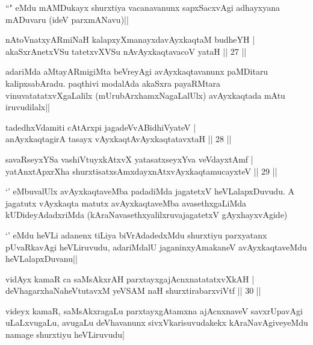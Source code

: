 \begin{artha}
``\stext " eMdu mAMDukayx shurxtiya vacanavanunx sapxSacxvAgi adhayxyana mADuvaru (ideV parxmANavu)||
\end{artha}

\begin{shl}
nAtoV\s natxyARmiNaH kalapxyXmanayxdavAyxkaqtaM budheYH |\\
akaSxrAnetxVSu tatetxvXVSu nAvAyxkaqtavacoV yataH \hfill || 27 ||
\end{shl}

\begin{artha}
adariMda aMtayARmigiMta beVreyAgi avAyxkaqtavanunx paMDitaru kalipxsabAradu. paqthivi modalAda akaSxra payaRMtara vinuvatatatxvXgaLalilx (mUrubArxhamxNagaLalUlx) avAyxkaqtada mAtu iruvudilalx||
\end{artha}

\begin{shl}
tadedhxVdamiti cAtArxpi jagadeVvABidhiVyateV |\\
anAyxkaqtagirA tasayx vAyxkaqtAvAyxkaqtatavxtaH \hfill || 28 ||
\end{shl}

\begin{shl}
savaRseyxYSa vashiVtuyxkAtxvX yatasatxseyxYva veVdayxtAmf |\\
yatAnxtApxrXha shurxtisatxsAmxdayxnAtx\s vAyxkaqtamucayxteV \hfill || 29 ||
\end{shl}

\begin{artha}
`\stext ' eMbuvalUlx avAyxkaqtaveMba padadiMda jagatetxV heVLalapxDuvudu. A jagatutx vAyxkaqta matutx avAyxkaqtaveMba avasethxgaLiMda kUDideyAdadxriMda (kAraNavasethxyalilxruvajagatetxV gAyxhayxvAgide)

`\stext ' eMdu heVLi adanenx tiLiya biVrAdadedxMdu shurxtiyu parxyatanx pUvaRkavAgi heVLiruvudu, adariMdalU jaganinxyAmakaneV avAyxkaqtaveMdu heVLalapxDuvanu||
\end{artha}


\begin{shl}
vidAyx kamaR ca saMsAkxrAH parxtayxgajAcnxnatatatxvXkAH |\\
deVhagarxhaNaheVtutavxM yeVSAM naH shurxtirabarxviVtf \hfill || 30 ||
\end{shl}

\begin{artha}
videyx kamaR, saMsAkxragaLu parxtayxgAtamxna ajAcnxnaveV savxrUpavAgi uLaLxvugaLu, avugaLu deVhavanunx sivxVkarisuvudakekx kAraNavAgiveyeMdu namage shurxtiyu heVLiruvudu|
\end{artha}

